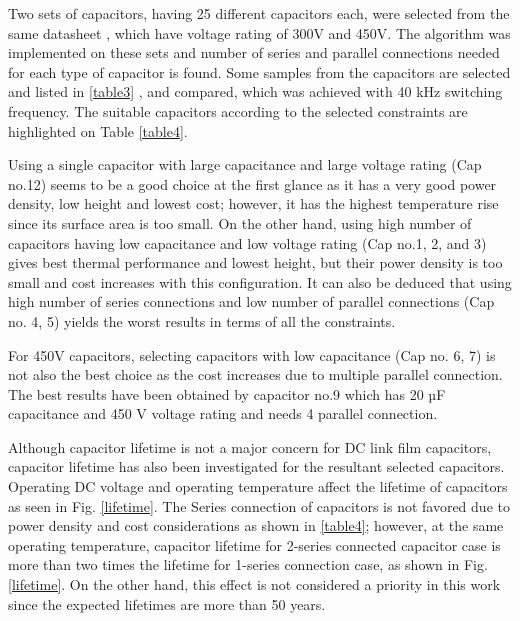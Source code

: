 \documentclass[conference,a4paper,twocolumn]{IEEEtran}
\begin{document}
Two sets of capacitors, having 25 different capacitors each, were selected from the same datasheet \cite{Polypropylene2009}, which have voltage rating of 300V and 450V. The algorithm was implemented on these sets and number of series and parallel connections needed for each type of capacitor is found. Some samples from the capacitors are selected and listed in \ref{table3} \cite{Polypropylene2009}, and compared, which was achieved with 40 kHz switching frequency. The suitable capacitors according to the selected constraints are highlighted on Table \ref{table4}.

Using a single capacitor with large capacitance and large voltage rating (Cap no.12) seems to be a good choice at the first glance as it has a very good power density, low height and lowest cost; however, it has the highest temperature rise since its surface area is too small. On the other hand, using high number of capacitors having low capacitance and low voltage rating (Cap no.1, 2, and 3) gives best thermal performance and lowest height, but their power density is too small and cost increases with this configuration. It can also be deduced that using high number of series connections and low number of parallel connections (Cap no. 4, 5) yields the worst results in terms of all the constraints.

For 450V capacitors, selecting capacitors with low capacitance (Cap no. 6, 7) is not also the best choice as the cost increases due to multiple parallel connection. The best results have been obtained by capacitor no.9 which has 20 µF capacitance and 450 V voltage rating and needs 4 parallel connection.

Although capacitor lifetime is not a major concern for DC link film capacitors, capacitor lifetime has also been investigated for the resultant selected capacitors. Operating DC voltage and operating temperature affect the lifetime of capacitors as seen in Fig. \ref{lifetime}. The Series connection of capacitors is not favored due to power density and cost considerations as shown in \ref{table4}; however, at the same operating temperature, capacitor lifetime for 2-series connected capacitor case is more than two times the lifetime for 1-series connection case, as shown in Fig. \ref{lifetime}. On the other hand, this effect is not considered a priority in this work since the expected lifetimes are more than 50 years.
\end{document}

